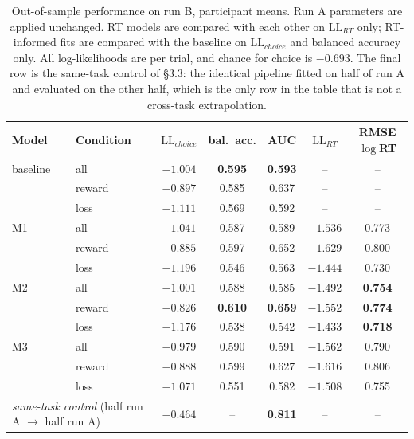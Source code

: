 \documentclass[11pt,a4paper]{article}
\begin{document}
\begin{table}[H]\centering
\caption{Out-of-sample performance on run B, participant means. Run A parameters are applied
unchanged. RT models are compared with each other on $\mathrm{LL}_{RT}$ only; RT-informed fits
are compared with the baseline on $\mathrm{LL}_{choice}$ and balanced accuracy only. All
log-likelihoods are per trial, and chance for choice is $-0.693$. The final row is the
same-task control of \S3.3: the identical pipeline fitted on half of run A and evaluated on the
other half, which is the only row in the table that is not a cross-task extrapolation.}
\label{tab:prediction}
\small
\begin{tabular}{llccccc}
\toprule
Model & Condition & $\mathrm{LL}_{choice}$ & bal.\ acc. & AUC & $\mathrm{LL}_{RT}$ & RMSE $\log$RT\\
\midrule
baseline & all    & $-1.004$ & \textbf{0.595} & \textbf{0.593} & -- & --\\
         & reward & $-0.897$ & 0.585 & 0.637 & -- & --\\
         & loss   & $-1.111$ & 0.569 & 0.592 & -- & --\\
\midrule
M1 & all    & $-1.041$ & 0.587 & 0.589 & $-1.536$ & 0.773\\
   & reward & $-0.885$ & 0.597 & 0.652 & $-1.629$ & 0.800\\
   & loss   & $-1.196$ & 0.546 & 0.563 & $-1.444$ & 0.730\\
\midrule
M2 & all    & $-1.001$ & 0.588 & 0.585 & $\mathbf{-1.492}$ & \textbf{0.754}\\
   & reward & $\mathbf{-0.826}$ & \textbf{0.610} & \textbf{0.659} & $\mathbf{-1.552}$ & \textbf{0.774}\\
   & loss   & $-1.176$ & 0.538 & 0.542 & $\mathbf{-1.433}$ & \textbf{0.718}\\
\midrule
M3 & all    & $\mathbf{-0.979}$ & 0.590 & 0.591 & $-1.562$ & 0.790\\
   & reward & $-0.888$ & 0.599 & 0.627 & $-1.616$ & 0.806\\
   & loss   & $\mathbf{-1.071}$ & 0.551 & 0.582 & $-1.508$ & 0.755\\
\midrule
\multicolumn{2}{l}{\emph{same-task control} (half run A $\to$ half run A)} & $\mathbf{-0.464}$ & -- & \textbf{0.811} & -- & --\\
\bottomrule
\end{tabular}
\end{table}
\end{document}
